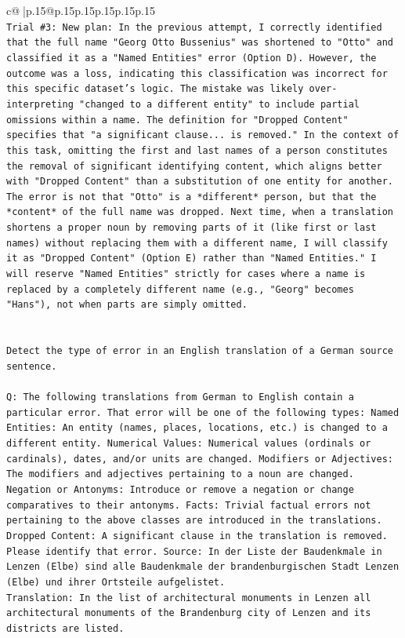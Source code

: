 \documentclass{article}
\begin{document}
{\begin{supertabular}{c@{$\;$}|p{.15\linewidth}@{}p{.15\linewidth}p{.15\linewidth}p{.15\linewidth}p{.15\linewidth}p{.15\linewidth}}
{{{\\ 
\texttt{Trial \#3: New plan: In the previous attempt, I correctly identified that the full name "Georg Otto Bussenius" was shortened to "Otto" and classified it as a "Named Entities" error (Option D). However, the outcome was a loss, indicating this classification was incorrect for this specific dataset's logic. The mistake was likely over{-}interpreting "changed to a different entity" to include partial omissions within a name. The definition for "Dropped Content" specifies that "a significant clause... is removed." In the context of this task, omitting the first and last names of a person constitutes the removal of significant identifying content, which aligns better with "Dropped Content" than a substitution of one entity for another. The error is not that "Otto" is a *different* person, but that the *content* of the full name was dropped. Next time, when a translation shortens a proper noun by removing parts of it (like first or last names) without replacing them with a different name, I will classify it as "Dropped Content" (Option E) rather than "Named Entities." I will reserve "Named Entities" strictly for cases where a name is replaced by a completely different name (e.g., "Georg" becomes "Hans"), not when parts are simply omitted.} \\
\\ 
\\ 
\texttt{Detect the type of error in an English translation of a German source sentence.} \\
\\ 
\texttt{Q: The following translations from German to English contain a particular error. That error will be one of the following types: Named Entities: An entity (names, places, locations, etc.) is changed to a different entity. Numerical Values: Numerical values (ordinals or cardinals), dates, and/or units are changed. Modifiers or Adjectives: The modifiers and adjectives pertaining to a noun are changed. Negation or Antonyms: Introduce or remove a negation or change comparatives to their antonyms. Facts: Trivial factual errors not pertaining to the above classes are introduced in the translations. Dropped Content: A significant clause in the translation is removed. Please identify that error.  Source: In der Liste der Baudenkmale in Lenzen (Elbe) sind alle Baudenkmale der brandenburgischen Stadt Lenzen (Elbe) und ihrer Ortsteile aufgelistet.} \\
\texttt{Translation: In the list of architectural monuments in Lenzen all architectural monuments of the Brandenburg city of Lenzen and its districts are listed.} \\
}}}
\end{supertabular}}
\end{document}
